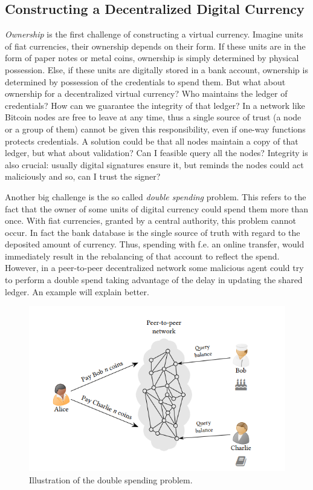 \bigskip
\subsection{Constructing a Decentralized Digital Currency}
\label{sec:decentralized-currency}
\textit{Ownership} is the first challenge of constructing a virtual currency. Imagine units of fiat currencies, their ownership depends on their form. If these units are in the form of paper notes or metal coins, ownership is simply determined by physical possession. Else, if these units are digitally stored in a bank account, ownership is determined by possession of the credentials to spend them. But what about ownership for a decentralized virtual currency? Who maintains the ledger of credentials? How can we guarantee the integrity of that ledger? In a network like Bitcoin nodes are free to leave at any time, thus a single source of trust (a node or a group of them) cannot be given this responsibility, even if one-way functions protects credentials. A solution could be that all nodes maintain a copy of that ledger, but what about validation? Can I feasible query all the nodes? Integrity is also crucial: usually digital signatures ensure it, but reminds the nodes could act maliciously and so, can I trust the signer?

\bigskip
\noindent
Another big challenge is the so called \textit{double spending} problem. This refers to the fact that the owner of some units of digital currency could spend them more than once. With fiat currencies, granted by a central authority, this problem cannot occur. In fact the bank database is the single source of truth with regard to the deposited amount of currency. Thus, spending with f.e. an online transfer, would immediately result in the rebalancing of that account to reflect the spend. However, in a peer-to-peer decentralized network some malicious agent could try to perform a double spend taking advantage of the delay in updating the shared ledger. An example will explain better.

\begin{figure}[!htbp]
    \centering
    \includegraphics[width=1\linewidth]{Images/double-spending.png}
    \caption{Illustration of the double spending problem.}
    \label{fig:double}
\end{figure}

